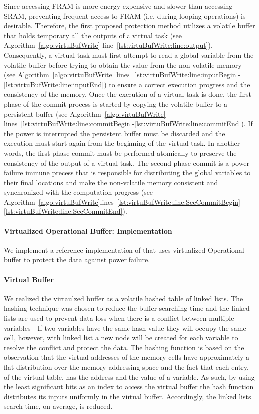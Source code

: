 Since accessing FRAM is more energy expensive and slower than accessing SRAM, preventing frequent access to FRAM (i.e. during looping operations) is desirable. Therefore, the first proposed protection method utilizes a volatile buffer that holds temporary all the outputs of a virtual task (see Algorithm~\ref{algo:virtuBufWrite} line~\ref{lst:virtuBufWrite:line:output}). Consequently, a virtual task must first attempt to read a global variable from the volatile buffer before trying to obtain the value from the non-volatile memory (see Algorithm~\ref{algo:virtuBufWrite} lines~\ref{lst:virtuBufWrite:line:inputBegin}-\ref{lst:virtuBufWrite:line:inputEnd}) to ensure a correct execution progress and the consistency of the memory. Once the execution of a virtual task is done, the first phase of the commit process is started by copying the volatile buffer to a persistent buffer (see Algorithm~\ref{algo:virtuBufWrite} lines~\ref{lst:virtuBufWrite:line:commitBegin}-\ref{lst:virtuBufWrite:line:commitEnd}). If the power is interrupted the persistent buffer must be discarded and the execution must start again from the beginning of the virtual task. In another words, the first phase commit must be performed atomically to preserve the consistency of the output of a virtual task. The second phase commit is a power failure immune precess that is responsible for distributing the global variables to their final locations and make the non-volatile memory consistent and synchronized with the computation progress (see Algorithm~\ref{algo:virtuBufWrite}lines~\ref{lst:virtuBufWrite:line:SecCommitBegin}-\ref{lst:virtuBufWrite:line:SecCommitEnd}).


\paragraph{Virtualized Operational Buffer: Implementation} 

We implement a reference implementation of \sys that uses virtualized Operational buffer to protect the data against power failure. 
\paragraph{Virtual Buffer}
We realized the virtaulzed buffer as a volatile hashed table of linked lists. The hashing technique was chosen to reduce the buffer searching time and the linked lists are used to prevent data loss when there is a conflict between multiple variables---If two variables have the same hash value they will occupy the same cell, however, with linked list a new node will be created for each variable to resolve the conflict and protect the data. The hashing function is based on the observation that the virtual addresses of the memory cells have approximately a flat distribution over the memory addressing space and the fact that each entry, of the virtual table, has the address and the value of a variable. As such, by using the least significant bits as an index to access the virtual buffer the hash function distributes its inputs uniformly in the virtual buffer. Accordingly, the linked lists search time, on average, is reduced. 


